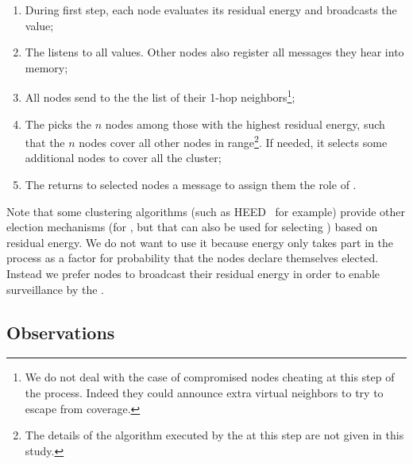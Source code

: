 \begin{enumerate}
    \item During first step, each node evaluates its residual energy and broadcasts the value;
    \item The \ch listens to all values. Other nodes also register all messages they hear into memory;
    \item All nodes send to the \CH the list of their 1-hop neighbors\footnote{We do not deal with the case of compromised nodes cheating at this step of the process. Indeed they could announce extra virtual neighbors to try to escape from coverage.};
    \item The \CH picks the $n$ nodes among those with the highest residual energy, such that the $n$ nodes cover all other nodes in range\footnote{The details of the algorithm executed by the \ch at this step are not given in this study.}. If needed, it selects some additional nodes to cover all the cluster;
    \item The \CH returns to selected nodes a message to assign them the role of \cn.
\end{enumerate}

Note that some clustering algorithms (such as HEED~\cite{YF04} for example) provide other election mechanisms (for \chs, but that can also be used for selecting \cns) based on residual energy.
We do not want to use it because energy only takes part in the process as a factor for probability that the nodes declare themselves elected.
Instead we prefer nodes to broadcast their residual energy in order to enable surveillance by the \vns.

    \subsection{Observations}

